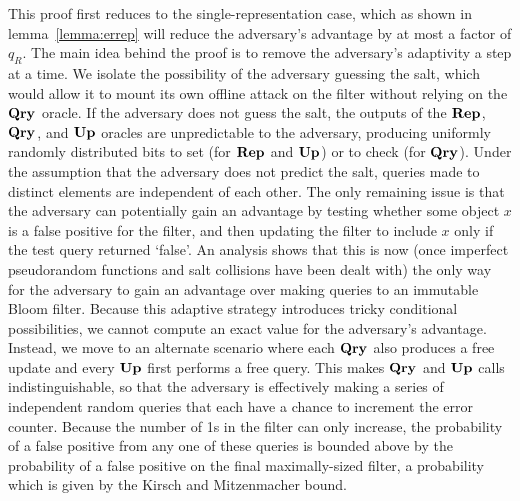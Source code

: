 This proof first reduces to the single-representation case, which as shown in lemma~\ref{lemma:errep} will reduce the adversary's advantage by at most a factor of $q_R$. The main idea behind the proof is to remove the adversary's adaptivity a step at a time. We isolate the possibility of the adversary guessing the salt, which would allow it to mount its own offline attack on the filter without relying on the $\mathbf{Qry}\hspace{0.5pt}$ oracle. If the adversary does not guess the salt, the outputs of the $\mathbf{Rep}\hspace{0.5pt}$, $\mathbf{Qry}\hspace{0.5pt}$, and $\mathbf{Up}\hspace{0.5pt}$ oracles are unpredictable to the adversary, producing uniformly randomly distributed bits to set (for $\mathbf{Rep}\hspace{0.5pt}$ and $\mathbf{Up}\hspace{0.5pt}$) or to check (for $\mathbf{Qry}\hspace{0.5pt}$). Under the assumption that the adversary does not predict the salt, queries made to distinct elements are independent of each other. The only remaining issue is that the adversary can potentially gain an advantage by testing whether some object $x$ is a false positive for the filter, and then updating the filter to include $x$ only if the test query returned `false'. An analysis shows that this is now (once imperfect pseudorandom functions and salt collisions have been dealt with) the only way for the adversary to gain an advantage over making queries to an immutable Bloom filter. Because this adaptive strategy introduces tricky conditional possibilities, we cannot compute an exact value for the adversary's advantage. Instead, we move to an alternate scenario where each $\mathbf{Qry}\hspace{0.5pt}$ also produces a free update and every $\mathbf{Up}\hspace{0.5pt}$ first performs a free query. This makes $\mathbf{Qry}\hspace{0.5pt}$ and $\mathbf{Up}\hspace{0.5pt}$ calls indistinguishable, so that the adversary is effectively making a series of independent random queries that each have a chance to increment the error counter. Because the number of 1s in the filter can only increase, the probability of a false positive from any one of these queries is bounded above by the probability of a false positive on the final maximally-sized filter, a probability which is given by the Kirsch and Mitzenmacher bound.

